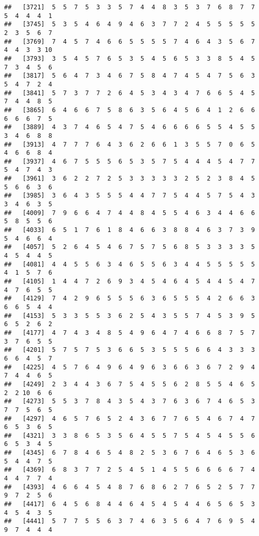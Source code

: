 \documentclass[
]{book}
\begin{document}
\begin{verbatim}
##   [3721]  5  5  7  5  3  3  5  7  4  4  8  3  5  3  7  6  8  7  7  5  4  4  4  1
##   [3745]  5  3  5  4  6  4  9  4  6  3  7  7  2  4  5  5  5  5  5  2  3  5  6  7
##   [3769]  7  4  5  7  4  6  6  5  5  5  5  7  4  6  4  3  5  6  7  4  4  3  3 10
##   [3793]  3  5  4  5  7  6  5  3  5  4  5  6  5  3  3  8  5  4  5  7  3  4  5  6
##   [3817]  5  6  4  7  3  4  6  7  5  8  4  7  4  5  4  7  5  6  3  5  4  7  2  4
##   [3841]  5  7  3  7  7  2  6  4  5  3  4  3  4  7  6  6  5  4  5  7  4  4  8  5
##   [3865]  6  4  6  6  7  5  8  6  3  5  6  4  5  6  4  1  2  6  6  6  6  6  7  5
##   [3889]  4  3  7  4  6  5  4  7  5  4  6  6  6  6  5  5  4  5  5  3  4  6  8  8
##   [3913]  4  7  7  7  6  4  3  6  2  6  6  1  3  5  5  7  0  6  5  4  6  6  8  4
##   [3937]  4  6  7  5  5  5  6  5  3  5  7  5  4  4  4  5  4  7  7  5  4  7  4  3
##   [3961]  3  6  2  2  7  2  5  3  3  3  3  3  2  5  2  3  8  4  5  5  6  6  3  6
##   [3985]  3  6  4  3  5  5  5  4  4  7  7  5  4  4  5  7  5  4  3  3  4  6  3  5
##   [4009]  7  9  6  6  4  7  4  4  8  4  5  5  4  6  3  4  4  6  6  5  8  5  5  6
##   [4033]  6  5  1  7  6  1  8  4  6  6  3  8  8  4  6  3  7  3  9  5  4  6  6  4
##   [4057]  5  2  6  4  5  4  6  7  5  7  5  6  8  5  3  3  3  3  5  4  5  4  4  5
##   [4081]  4  4  5  5  6  3  4  6  5  5  6  3  4  4  5  5  5  5  5  4  1  5  7  6
##   [4105]  1  4  4  7  2  6  9  3  4  5  4  6  4  5  4  4  5  4  7  4  7  6  5  5
##   [4129]  7  4  2  9  6  5  5  5  6  3  6  5  5  5  4  2  6  6  3  6  6  5  4  4
##   [4153]  5  3  3  5  5  3  6  2  5  4  3  5  5  7  4  5  3  9  5  6  5  2  6  2
##   [4177]  4  7  4  3  4  8  5  4  9  6  4  7  4  6  6  8  7  5  7  3  7  6  5  5
##   [4201]  5  7  5  7  5  3  6  6  5  3  5  5  5  6  6  4  3  3  3  6  6  4  5  7
##   [4225]  4  5  7  6  4  9  6  4  9  6  3  6  6  3  6  7  2  9  4  7  4  4  6  5
##   [4249]  2  3  4  4  3  6  7  5  4  5  5  6  2  8  5  5  4  6  5  2  2 10  6  6
##   [4273]  5  5  3  7  8  4  3  5  4  3  7  6  3  6  7  4  6  5  3  7  7  5  6  5
##   [4297]  4  6  5  7  6  5  2  4  3  6  7  7  6  5  4  6  7  4  7  6  5  3  6  5
##   [4321]  3  3  8  6  5  3  5  6  4  5  5  7  5  4  5  4  5  5  6  6  5  3  4  5
##   [4345]  6  7  8  4  6  5  4  8  2  5  3  6  7  6  4  6  5  3  6  5  4  4  7  5
##   [4369]  6  8  3  7  7  2  5  4  5  1  4  5  5  6  6  6  6  7  4  4  4  7  7  4
##   [4393]  4  6  6  4  5  4  8  7  6  8  6  2  7  6  5  2  5  7  7  9  7  2  5  6
##   [4417]  6  4  5  6  8  4  4  6  4  5  4  5  4  4  6  5  6  5  3  4  5  4  3  5
##   [4441]  5  7  7  5  5  6  3  7  4  6  3  5  6  4  7  6  9  5  4  9  7  4  4  4

\end{verbatim}
\end{document}
